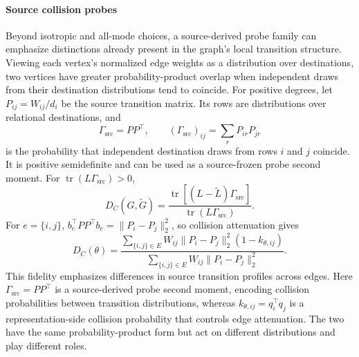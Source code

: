 \paragraph{Source collision probes}
Beyond isotropic and all-mode choices, a source-derived probe family can emphasize distinctions already present in the graph's local transition structure.
Viewing each vertex's normalized edge weights as a distribution over destinations, two vertices have greater probability-product overlap when independent draws from their destination distributions tend to coincide.
For positive degrees, let $P_{ij}=W_{ij}/d_i$ be the source transition matrix.
Its rows are distributions over relational destinations, and
\begin{equation}
\Gamma_{\mathrm{src}}=PP^\top,\qquad
(\Gamma_{\mathrm{src}})_{ij}=\sum_rP_{ir}P_{jr}
\end{equation}
is the probability that independent destination draws from rows $i$ and $j$ coincide.
It is positive semidefinite and can be used as a source-frozen probe second moment.
For $\operatorname{tr}(L\Gamma_{\mathrm{src}})>0$,
\begin{equation}
D_C(G,\widetilde G)
=\frac{\operatorname{tr}[(L-\widetilde L)\Gamma_{\mathrm{src}}]}
{\operatorname{tr}(L\Gamma_{\mathrm{src}})}.
\label{eq:source-collision-covariance-distortion}
\end{equation}
For $e=\{i,j\}$, $b_e^\top PP^\top b_e=\|P_i-P_j\|_2^2$, so collision attenuation gives
\begin{equation}
D_C(\theta)=
\frac{\sum_{\{i,j\}\in E}W_{ij}\|P_i-P_j\|_2^2(1-k_{\theta,ij})}
{\sum_{\{i,j\}\in E}W_{ij}\|P_i-P_j\|_2^2}.
\label{eq:source-collision-edge-distortion}
\end{equation}
This fidelity emphasizes differences in source transition profiles across edges.
Here $\Gamma_{\mathrm{src}}=PP^\top$ is a source-derived probe second moment, encoding collision probabilities between transition distributions, whereas $k_{\theta,ij}=q_i^\top q_j$ is a representation-side collision probability that controls edge attenuation.
The two have the same probability-product form but act on different distributions and play different roles.

